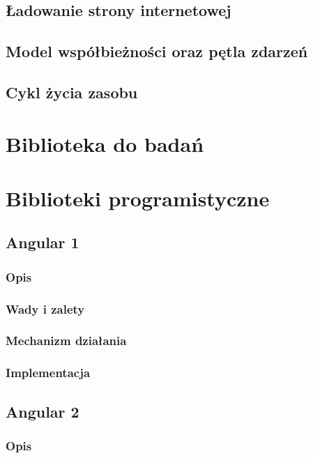 \documentclass[polish, twoside, 12pt]{mwart}
\let\stdsection\section
\renewcommand*{\section}{\clearpage\stdsection}
\begin{document}
\subsection{Ładowanie strony internetowej}

\subsection{Model współbieżności oraz pętla zdarzeń}

\subsection{Cykl życia zasobu}

\section{Biblioteka do badań}

\section{Biblioteki programistyczne}

\subsection{Angular 1}

\subsubsection{Opis}

\subsubsection{Wady i zalety}

\subsubsection{Mechanizm działania}

\subsubsection{Implementacja}

\subsection{Angular 2}

\subsubsection{Opis}
\end{document}
